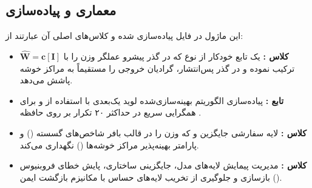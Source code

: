 \subsection{معماری و پیاده‌سازی}
این ماژول در فایل  پیاده‌سازی شده و کلاس‌های اصلی آن عبارتند از:
\begin{itemize}
    \item \textbf{کلاس :} یک تابع خودکار از نوع  که در گذر پیشرو عملگر وزن را با $\mathbf{\hat{W}} = \mathbf{c}[\mathbf{I}]$ ترکیب نموده و در گذر پس‌انتشار، گرادیان خروجی را مستقیماً به مراکز خوشه پاشش می‌دهد.
    \item \textbf{تابع :} پیاده‌سازی الگوریتم بهینه‌سازی‌شده لوید یک‌بعدی با استفاده از  و  برای همگرایی سریع در حداکثر ۲۰ تکرار بر روی حافظه .
    \item \textbf{کلاس :} لایه سفارشی جایگزین  و  که وزن را در قالب بافر شاخص‌های گسسته () و پارامتر بهینه‌پذیر مراکز خوشه‌ها () نگهداری می‌کند.
    \item \textbf{کلاس :} مدیریت پیمایش لایه‌های مدل، جایگزینی ساختاری، پایش خطای فروبنیوس بازسازی و جلوگیری از تخریب لایه‌های حساس با مکانیزم بازگشت ایمن ().
\end{itemize}
